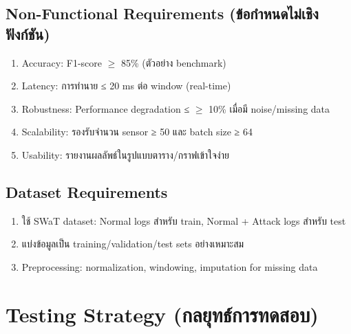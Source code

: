 \subsection{Non-Functional Requirements (ข้อกำหนดไม่เชิงฟังก์ชัน)}
\begin{enumerate}
    \item Accuracy: F1-score $\ge$ 85\% (ตัวอย่าง benchmark)
    \item Latency: การทำนาย ≤ 20 ms ต่อ window (real-time)
    \item Robustness: Performance degradation ≤ $\ge$ 10\% เมื่อมี noise/missing data
    \item Scalability: รองรับจำนวน sensor ≥ 50 และ batch size ≥ 64
    \item Usability: รายงานผลลัพธ์ในรูปแบบตาราง/กราฟเข้าใจง่าย
\end{enumerate}

\subsection{Dataset Requirements}
\begin{enumerate}
    \item ใช้ SWaT dataset: Normal logs สำหรับ train, Normal + Attack logs สำหรับ test
    \item แบ่งข้อมูลเป็น training/validation/test sets อย่างเหมาะสม
    \item Preprocessing: normalization, windowing, imputation for missing data
\end{enumerate}

\section{Testing Strategy (กลยุทธ์การทดสอบ)}
